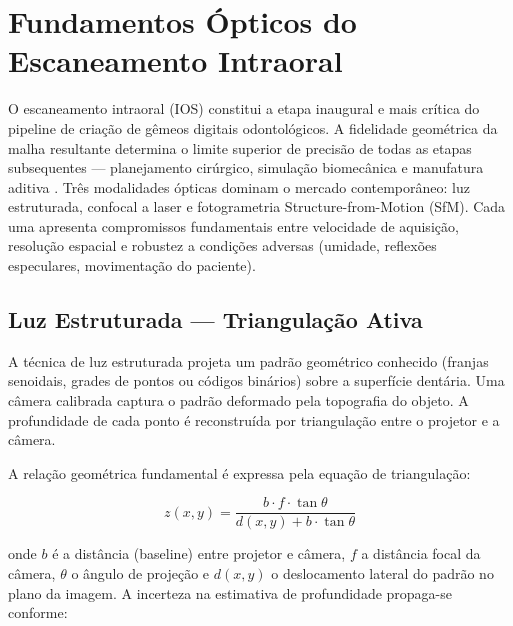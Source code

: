 
\section{Fundamentos Ópticos do Escaneamento Intraoral}
\label{sec:fundamentos-opticos}

O escaneamento intraoral (IOS) constitui a etapa inaugural e mais crítica do pipeline de criação de gêmeos digitais odontológicos. A fidelidade geométrica da malha resultante determina o limite superior de precisão de todas as etapas subsequentes — planejamento cirúrgico, simulação biomecânica e manufatura aditiva \cite{mangano2020intraoral}. Três modalidades ópticas dominam o mercado contemporâneo: luz estruturada, confocal a laser e fotogrametria Structure-from-Motion (SfM). Cada uma apresenta compromissos fundamentais entre velocidade de aquisição, resolução espacial e robustez a condições adversas (umidade, reflexões especulares, movimentação do paciente).

\subsection{Luz Estruturada — Triangulação Ativa}
\label{subsec:luz-estruturada}

A técnica de luz estruturada projeta um padrão geométrico conhecido (franjas senoidais, grades de pontos ou códigos binários) sobre a superfície dentária. Uma câmera calibrada captura o padrão deformado pela topografia do objeto. A profundidade de cada ponto é reconstruída por triangulação entre o projetor e a câmera.

A relação geométrica fundamental é expressa pela equação de triangulação:

\begin{equation}
\label{eq:triangulacao}
z(x,y) = \frac{b \cdot f \cdot \tan\theta}{d(x,y) + b \cdot \tan\theta}
\end{equation}

onde $b$ é a distância (baseline) entre projetor e câmera, $f$ a distância focal da câmera, $\theta$ o ângulo de projeção e $d(x,y)$ o deslocamento lateral do padrão no plano da imagem. A incerteza na estimativa de profundidade propaga-se conforme:

